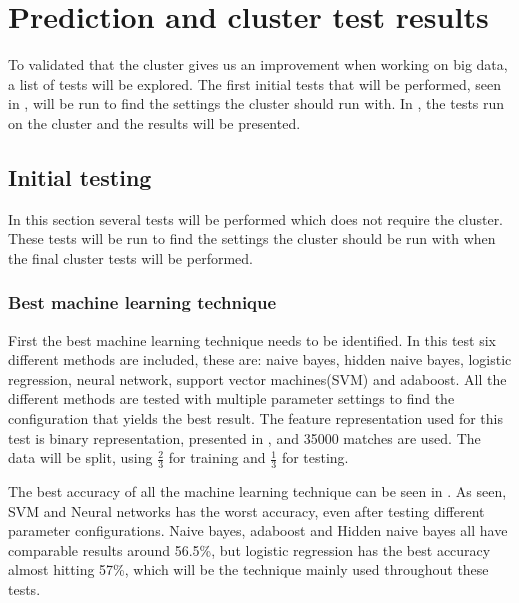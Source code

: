 \section{Prediction and cluster test results}\label{sec:testing}
To validated that the cluster gives us an improvement when working on big data, a list of tests will be explored. The first initial tests that will be performed, seen in , will be run to find the settings the cluster should run with. In , the tests run on the cluster and the results will be presented.

\subsection{Initial testing}\label{sec:initialtest}
In this section several tests will be performed which does not require the cluster. These tests will be run to find the settings the cluster should be run with when the final cluster tests will be performed.

\subsubsection{Best machine learning technique}
First the best machine learning technique needs to be identified. In this test six different methods are included, these are: naive bayes, hidden naive bayes, logistic regression, neural network, support vector machines(SVM) and adaboost. All the different methods are tested with multiple parameter settings to find the configuration that yields the best result. The feature representation used for this test is binary representation, presented in , and 35000 matches are used. The data will be split, using $\frac{2}{3}$ for training and $\frac{1}{3}$ for testing. 

The best accuracy of all the machine learning technique can be seen in . As seen, SVM and Neural networks has the worst accuracy, even after testing different parameter configurations. Naive bayes, adaboost and Hidden naive bayes all have comparable results around 56.5\%, but logistic regression has the best accuracy almost hitting 57\%, which will be the technique mainly used throughout these tests.  


